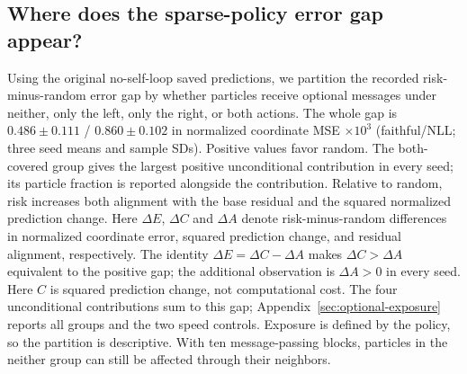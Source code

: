 \subsection{Where does the sparse-policy error gap appear?}
Using the original no-self-loop saved predictions, we partition the recorded
risk-minus-random error gap by whether particles
receive optional messages under neither, only the left, only the right, or
both actions. The whole gap is $0.486\pm0.111$ / $0.860\pm0.102$
in normalized coordinate MSE $\times10^3$ (faithful/NLL; three seed means
and sample SDs). Positive values favor random.
The both-covered group gives the largest positive unconditional contribution
in every seed; its particle fraction is reported alongside the contribution.
Relative to random, risk increases both alignment with the base residual
and the squared normalized prediction change. Here $\Delta E$, $\Delta C$
and $\Delta A$ denote risk-minus-random differences in normalized coordinate
error, squared prediction change, and residual alignment, respectively. The identity
$\Delta E=\Delta C-\Delta A$ makes $\Delta C>\Delta A$ equivalent to the
positive gap; the additional observation is $\Delta A>0$ in every seed.
Here $C$ is squared prediction change, not computational cost.
The four unconditional contributions sum to this gap; Appendix~\ref{sec:optional-exposure} reports
all groups and the two speed controls. Exposure is defined by the policy,
so the partition is descriptive. With ten message-passing blocks, particles
in the neither group can still be affected through their neighbors.
